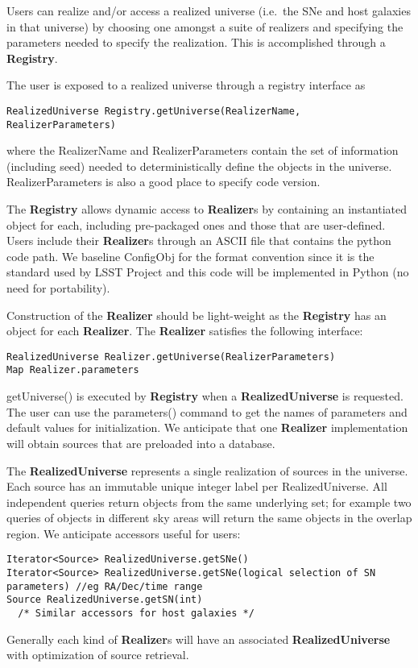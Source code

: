 \documentclass[preprint]{aastex}
\begin{document}
Users can realize and/or access a realized
universe (i.e.\ the SNe and host galaxies in that
universe) by choosing one amongst a suite of realizers and specifying
the parameters needed to specify the realization.  This is accomplished through a
{\bf Registry}.

The user is exposed to a realized universe through a registry interface as
\begin{verbatim}
RealizedUniverse Registry.getUniverse(RealizerName, RealizerParameters)
\end{verbatim}
where the RealizerName and RealizerParameters contain the set of information (including seed) needed
to deterministically define the objects in the universe.   RealizerParameters is also
a good place to specify code version.

The {\bf Registry} allows dynamic access to  {\bf Realizer}s by containing
an instantiated object for each, including 
pre-packaged ones and those that are user-defined.  Users include their {\bf Realizer}s
through
an  ASCII file that contains the 
python code path.
We baseline ConfigObj for the format convention since it is the standard used by
LSST Project and
this code will be implemented in Python (no need for portability).

Construction of the {\bf Realizer} should be light-weight as
the {\bf Registry} has an object for each  {\bf Realizer}.
The {\bf Realizer} satisfies the following interface:
\begin{verbatim}
RealizedUniverse Realizer.getUniverse(RealizerParameters)
Map Realizer.parameters
\end{verbatim}
getUniverse() is executed by {\bf Registry} when a {\bf RealizedUniverse} is requested.
The user can use the parameters() command to get the names of parameters and
default values for initialization.  We anticipate that one {\bf Realizer} implementation
will obtain sources that are preloaded into a database.

The {\bf RealizedUniverse} represents a single realization of sources in the universe.
Each source has an immutable unique integer label per RealizedUniverse.
All independent queries return objects from the same underlying set; for example two
queries of objects in different sky areas will return the same objects in the overlap
region.  We anticipate accessors useful for users:
\begin{verbatim}
Iterator<Source> RealizedUniverse.getSNe()
Iterator<Source> RealizedUniverse.getSNe(logical selection of SN parameters) //eg RA/Dec/time range
Source RealizedUniverse.getSN(int)
  /* Similar accessors for host galaxies */
\end{verbatim}
Generally each kind of {\bf Realizer}s will have an associated {\bf RealizedUniverse}
with optimization of source retrieval.
\end{document}
